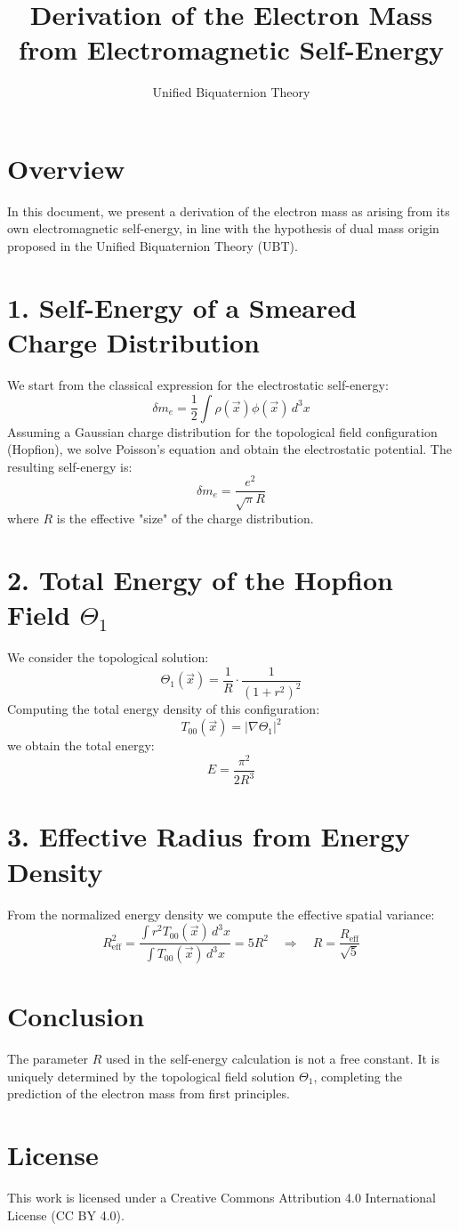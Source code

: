 \documentclass[11pt]{article}
\title{Derivation of the Electron Mass from Electromagnetic Self-Energy}
\author{Unified Biquaternion Theory}
\date{}
\begin{document}
\maketitle

\section*{Overview}

In this document, we present a derivation of the electron mass as arising from its own electromagnetic self-energy, in line with the hypothesis of dual mass origin proposed in the Unified Biquaternion Theory (UBT).

\section*{1. Self-Energy of a Smeared Charge Distribution}

We start from the classical expression for the electrostatic self-energy:
\[
\delta m_e = \frac{1}{2} \int \rho(\vec{x}) \phi(\vec{x})\, d^3x
\]
Assuming a Gaussian charge distribution for the topological field configuration (Hopfion), we solve Poisson's equation and obtain the electrostatic potential. The resulting self-energy is:
\[
\delta m_e = \frac{e^2}{\sqrt{\pi} R}
\]
where \( R \) is the effective "size" of the charge distribution.

\section*{2. Total Energy of the Hopfion Field \(\Theta_1\)}

We consider the topological solution:
\[
\Theta_1(\vec{x}) = \frac{1}{R} \cdot \frac{1}{(1 + r^2)^2}
\]
Computing the total energy density of this configuration:
\[
T_{00}(\vec{x}) = |\nabla \Theta_1|^2
\]
we obtain the total energy:
\[
E = \frac{\pi^2}{2 R^3}
\]

\section*{3. Effective Radius from Energy Density}

From the normalized energy density we compute the effective spatial variance:
\[
R_{\text{eff}}^2 = \frac{\int r^2 T_{00}(\vec{x})\, d^3x}{\int T_{00}(\vec{x})\, d^3x} = 5R^2
\quad \Rightarrow \quad R = \frac{R_{\text{eff}}}{\sqrt{5}}
\]

\section*{Conclusion}

The parameter \( R \) used in the self-energy calculation is not a free constant. It is uniquely determined by the topological field solution \(\Theta_1\), completing the prediction of the electron mass from first principles.


\section*{License}
This work is licensed under a Creative Commons Attribution 4.0 International License (CC BY 4.0).
\end{document}
